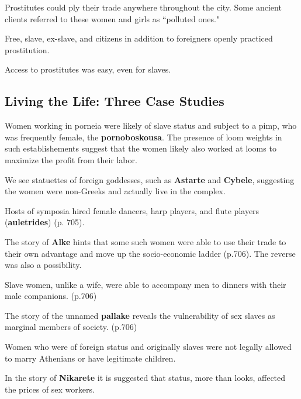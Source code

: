 Prostitutes could ply their trade anywhere throughout the city. Some ancient clients referred to these women and girls as ``polluted ones."

\begin{nte}
    Free, slave, ex-slave, and citizens in addition to foreigners openly practiced prostitution.
\end{nte}
Access to prostitutes was easy, even for slaves.


\subsection{Living the Life: Three Case Studies}


Women working in porneia were likely of slave status and subject to a pimp, who was frequently female, the \textbf{pornoboskousa}. The presence of loom weights in such establishements suggest that the women likely also worked at looms to maximize the profit from their labor. 

\begin{rmk}
    We see statuettes of foreign goddesses, such as \textbf{Astarte} and \textbf{Cybele}, suggesting the women were non-Greeks and actually live in the complex.
\end{rmk}

Hosts of symposia hired female dancers, harp players, and flute players (\textbf{auletrides}) (p. 705). 

The story of \textbf{Alke} hints that some such women were able to use their trade to their own advantage and move up the socio-economic ladder (p.706). The reverse was also a possibility.

\begin{rmk}
    Slave women, unlike a wife, were able to accompany men to dinners with their male companions. (p.706)
\end{rmk}

The story of the unnamed \textbf{pallake} reveals the vulnerability of sex slaves as marginal members of society. (p.706)


\begin{nte}
    Women who were of foreign status and originally slaves were not legally allowed to marry Athenians or have legitimate children.
\end{nte}

\begin{rmk}
    In the story of \textbf{Nikarete} it is suggested that status, more than looks, affected the prices of sex workers.
\end{rmk}

